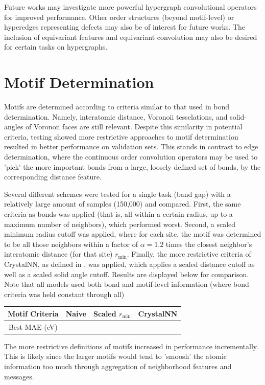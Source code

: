 \documentclass[10pt,a4paper]{article}
\begin{document}
Future works may investigate more powerful hypergraph convolutional operators for improved performance. Other order structures (beyond motif-level) or hyperedges representing defects may also be of interest for future works. The inclusion of equivariant features and equivariant convolution may also be desired for certain tasks on hypergraphs.



\nocite{*}




\appendix

\section{Motif Determination}
Motifs are determined according to criteria similar to that used in bond determination. Namely, interatomic distance, Voronoii tesselations, and solid-angles of Voronoii faces are still relevant. Despite this similarity in potential criteria, testing showed more restrictive approaches to motif determination resulted in better performance on validation sets. This stands in contrast to edge determination, where the continuous order convolution operators may be used to 'pick' the more important bonds from a large, loosely defined set of bonds, by the corresponding distance feature.

Several different schemes were tested for a single task (band gap) with a relatively large amount of samples (150,000) and compared. First, the same criteria as bonds was applied (that is, all within a certain radius, up to a maximum number of neighbors), which performed worst. Second, a scaled minimum radius cutoff was applied, where for each site, the motif was determined to be all those neighbors within a factor of $\alpha=1.2$ times the closest neighbor's interatomic distance (for that site) $r_{\text{min}}$. Finally, the more restrictive criteria of CrystalNN, as defined in \cite{crystalnn}, was applied, which applies a scaled distance cutoff as well as a scaled solid angle cutoff. Results are displayed below for comparison. Note that all models used both bond and motif-level information (where bond criteria was held constant through all)

\begin{center}

\begin{tabular}{c|ccc}

Motif Criteria & Naive & Scaled $r_{\text{min}}$& CrystalNN \\
\hline
Best MAE (eV)  \\
\end{tabular}
\end{center}
The more restrictive definitions of motifs increased in performance incrementally. This is likely since the larger motifs would tend to 'smoosh' the atomic information too much through aggregation of neighborhood features and messages.
\end{document}
